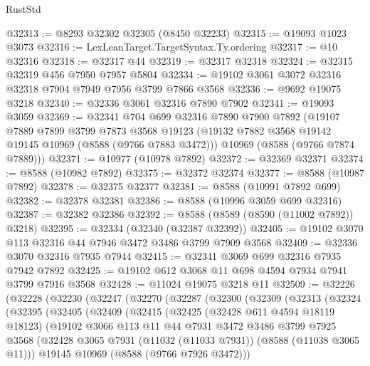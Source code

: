 \begin{lexlean}{RustStd}
\begin{coremodule}
@32313 := @8293 @32302 @32305 (@8450 @32233)
@32315 := @19093 @1023 @3073
@32316 := LexLeanTarget.TargetSyntax.Ty.ordering
@32317 := @10 @32316
@32318 := @32317 @44
@32319 := @32317 @32318
@32324 := @32315 @32319 @456 @7950 @7957 @5804
@32334 := @19102 @3061 @3072 @32316 @32318 @7904 @7949 @7956 @3799 @7866 @3568
@32336 := @9692 @19075 @3218
@32340 := @32336 @3061 @32316 @7890 @7902
@32341 := @19093 @3059
@32369 := @32341
    @704
    @699
    @32316
    @7890
    @7900
    @7892
    (@19107
      @7889
      @7899
      @3799
      @7873
      @3568
      @19123
      (@19132 @7882 @3568 @19142 @19145 @10969 (@8588 (@9766 @7883 @3472)))
      @10969
      (@8588 (@9766 @7874 @7889)))
@32371 := @10977 (@10978 @7892)
@32372 := @32369 @32371
@32374 := @8588 (@10982 @7892)
@32375 := @32372 @32374
@32377 := @8588 (@10987 @7892)
@32378 := @32375 @32377
@32381 := @8588 (@10991 @7892 @699)
@32382 := @32378 @32381
@32386 := @8588 (@10996 @3059 @699 @32316)
@32387 := @32382 @32386
@32392 := @8588 (@8589 (@8590 (@11002 @7892)) @3218)
@32395 := @32334 (@32340 (@32387 @32392))
@32405 := @19102 @3070 @113 @32316 @44 @7946 @3472 @3486 @3799 @7909 @3568
@32409 := @32336 @3070 @32316 @7935 @7944
@32415 := @32341 @3069 @699 @32316 @7935 @7942 @7892
@32425 := @19102 @612 @3068 @11 @698 @4594 @7934 @7941 @3799 @7916 @3568
@32428 := @11024 @19075 @3218 @11
@32509 := @32226
    (@32228
      (@32230
        (@32247
          (@32270
            (@32287
              (@32300
                (@32309
                  (@32313
                    (@32324
                      (@32395
                        (@32405
                          (@32409
                            (@32415
                              (@32425
                                (@32428 @611 @4594 @18119 @18123)
                                (@19102
                                  @3066
                                  @113
                                  @11
                                  @44
                                  @7931
                                  @3472
                                  @3486
                                  @3799
                                  @7925
                                  @3568
                                  (@32428
                                    @3065
                                    @7931
                                    (@11032 (@11033 @7931))
                                    (@8588 (@11038 @3065 @11)))
                                  @19145
                                  @10969
                                  (@8588 (@9766 @7926 @3472)))

\end{coremodule}
\end{lexlean}
